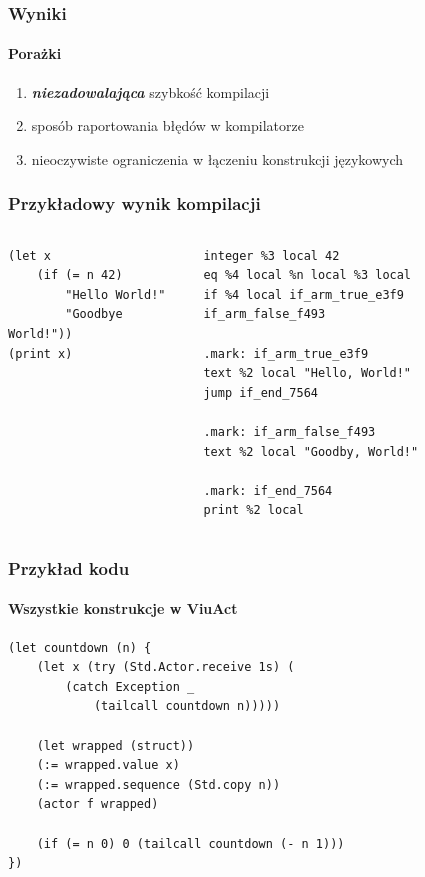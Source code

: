 \documentclass[aspectratio=169]{beamer}
\begin{document}
\begin{frame}
    \frametitle{Wyniki}
    \framesubtitle{Porażki}

    \begin{enumerate}
        \item \emph{\textbf{niezadowalająca}} szybkość kompilacji
        \item sposób raportowania błędów w kompilatorze
        \item nieoczywiste ograniczenia w łączeniu konstrukcji językowych
    \end{enumerate}
\end{frame}

\begin{frame}[fragile]
    \frametitle{Przykładowy wynik kompilacji}

    \begin{columns}
        \begin{column}{0.5\textwidth}
            \begin{small}
            \begin{lstlisting}
(let x
    (if (= n 42)
        "Hello World!"
        "Goodbye World!"))
(print x)
            \end{lstlisting}
            \end{small}
        \end{column}
        \begin{column}{0.5\textwidth}
            \begin{tiny}
            \begin{lstlisting}
integer %3 local 42
eq %4 local %n local %3 local
if %4 local if_arm_true_e3f9 if_arm_false_f493

.mark: if_arm_true_e3f9
text %2 local "Hello, World!"
jump if_end_7564

.mark: if_arm_false_f493
text %2 local "Goodby, World!"

.mark: if_end_7564
print %2 local
            \end{lstlisting}
            \end{tiny}
        \end{column}
    \end{columns}
\end{frame}

\begin{frame}[fragile]
    \frametitle{Przykład kodu}
    \framesubtitle{Wszystkie konstrukcje w ViuAct}

    \begin{small}
    \begin{lstlisting}
(let countdown (n) {
    (let x (try (Std.Actor.receive 1s) (
        (catch Exception _
            (tailcall countdown n)))))

    (let wrapped (struct))
    (:= wrapped.value x)
    (:= wrapped.sequence (Std.copy n))
    (actor f wrapped)

    (if (= n 0) 0 (tailcall countdown (- n 1)))
})
    \end{lstlisting}
    \end{small}
\end{frame}
\end{document}
